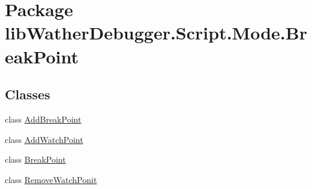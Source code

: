\hypertarget{namespacelib_wather_debugger_1_1_script_1_1_mode_1_1_break_point}{\section{Package lib\+Wather\+Debugger.\+Script.\+Mode.\+Break\+Point}
\label{namespacelib_wather_debugger_1_1_script_1_1_mode_1_1_break_point}
}
\subsection*{Classes}
\begin{DoxyCompactItemize}
\item 
class \hyperlink{classlib_wather_debugger_1_1_script_1_1_mode_1_1_break_point_1_1_add_break_point}{Add\+Break\+Point}
\item 
class \hyperlink{classlib_wather_debugger_1_1_script_1_1_mode_1_1_break_point_1_1_add_watch_point}{Add\+Watch\+Point}
\item 
class \hyperlink{classlib_wather_debugger_1_1_script_1_1_mode_1_1_break_point_1_1_break_point}{Break\+Point}
\item 
class \hyperlink{classlib_wather_debugger_1_1_script_1_1_mode_1_1_break_point_1_1_remove_watch_ponit}{Remove\+Watch\+Ponit}
\end{DoxyCompactItemize}
